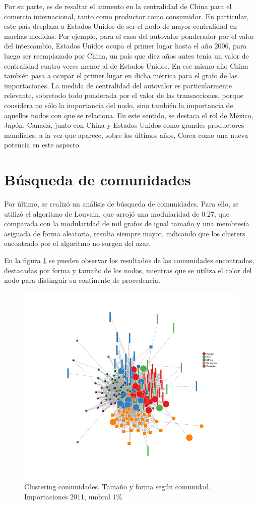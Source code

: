 \documentclass[runningheads,a4paper]{llncs}
\begin{document}
Por su parte, es de resaltar el aumento en la centralidad de China para el comercio internacional, tanto como productor como consumidor. En particular, este país desplaza a Estados Unidos de ser el nodo de mayor centralidad en muchas medidas. Por ejemplo, para el caso del autovalor ponderador por el valor del intercambio, Estados Unidos ocupa el primer lugar hasta el año 2006, para luego ser reemplazado por China, un país que diez años antes tenía un valor de centralidad cuatro veces menor al de Estados Unidos. En ese mismo año China también pasa a ocupar el primer lugar en dicha métrica para el grafo de las importaciones. La medida de centralidad del autovalor es particularmente relevante, sobretodo todo ponderada por el valor de las transacciones, porque considera no sólo la importancia del nodo, sino también la importancia de aquellos nodos con que se relaciona. En este sentido, se destaca el rol de México, Japón, Canadá, junto con China y Estados Unidos como grandes productores mundiales, a la vez que aparece, sobre los últimos años, Corea como una nueva potencia en este aspecto.  

\section{Búsqueda de comunidades}

Por último, se realizó un análisis de búsqueda de comunidades. Para ello, se utilizó el algoritmo de Louvain, que arrojó una modularidad de 0.27, que comparada con la modularidad de mil grafos de igual tamaño y una membresía asignada de forma aleatoria, resulta siempre mayor, indicando que los clusters encontrado por el algoritmo no surgen del azar.

En la figura \ref{fig:comunidades} se pueden observar los resultados de las comunidades encontradas, destacadas por forma y tamaño de los nodos, mientras que se utiliza el color del nodo para distinguir su continente de procedencia. 

\begin{figure}[h!]
    \centering
    \includegraphics[width=.75\linewidth]{grafo_2011_comunidades}
    \caption{Clustering comunidades. Tamaño y forma según comunidad. Importaciones 2011, umbral 1\%}
    \label{fig:comunidades}
\end{figure}
\end{document}
